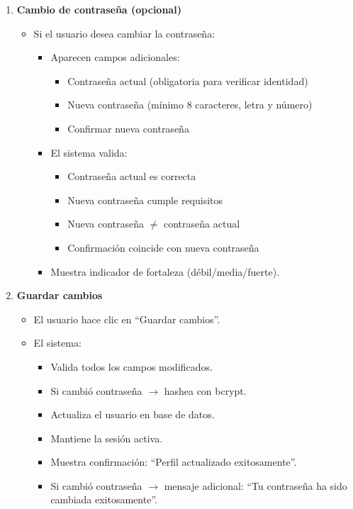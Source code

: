 \begin{enumerate}[nosep]
    \item \textbf{Cambio de contraseña (opcional)}
    \begin{itemize}[nosep]
        \item Si el usuario desea cambiar la contraseña:
        \begin{itemize}[nosep]
            \item Aparecen campos adicionales:
            \begin{itemize}[nosep]
                \item Contraseña actual (obligatoria para verificar identidad)
                \item Nueva contraseña (mínimo 8 caracteres, letra y número)
                \item Confirmar nueva contraseña
            \end{itemize}
            \item El sistema valida:
            \begin{itemize}[nosep]
                \item Contraseña actual es correcta
                \item Nueva contraseña cumple requisitos
                \item Nueva contraseña $\neq$ contraseña actual
                \item Confirmación coincide con nueva contraseña
            \end{itemize}
            \item Muestra indicador de fortaleza (débil/media/fuerte).
        \end{itemize}
    \end{itemize}

    \item \textbf{Guardar cambios}
    \begin{itemize}[nosep]
        \item El usuario hace clic en ``Guardar cambios''.
        \item El sistema:
        \begin{itemize}[nosep]
            \item Valida todos los campos modificados.
            \item Si cambió contraseña $\rightarrow$ hashea con bcrypt.
            \item Actualiza el usuario en base de datos.
            \item Mantiene la sesión activa.
            \item Muestra confirmación: ``Perfil actualizado exitosamente''.
            \item Si cambió contraseña $\rightarrow$ mensaje adicional: ``Tu contraseña ha sido cambiada exitosamente''.
        \end{itemize}
    \end{itemize}
\end{enumerate}

